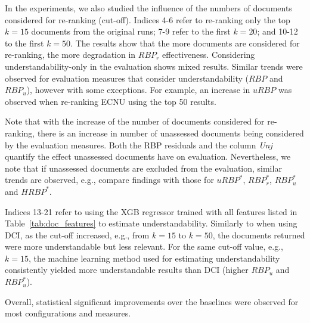 In the experiments, we also studied the influence of the numbers of documents considered for re-ranking (cut-off). Indices 4-6 refer to re-ranking only the top $k=15$ documents from the original runs; 7-9 refer to the first $k=20$; and 10-12 to the first $k=50$. The results show that the more documents are considered for re-ranking, the more degradation in $RBP_r$ effectiveness. Considering understandability-only in the evaluation shows mixed results. Similar trends were observed for evaluation measures that consider understandability ($RBP$ and $RBP_u$), however with some exceptions. For example, an increase in $uRBP$ was observed when re-ranking ECNU using the top 50 results. 

Note that with the increase of the number of documents considered for re-ranking, there is an increase in number of unassessed documents being considered by the evaluation measures. Both the RBP residuals and the column \textit{Unj} quantify the effect unassessed documents have on evaluation. Nevertheless, we note that if unassessed documents are excluded from the evaluation, similar trends are observed, e.g., compare findings with those for $uRBP^*$, $RBP_r^*$, $RBP_u^*$ and $HRBP^*$.


Indices 13-21 refer to using the XGB regressor trained with all features listed in Table~\ref{tab:doc_features} to estimate understandability. Similarly to when using DCI, as the cut-off increased, e.g., from $k=15$ to $k=50$, the documents returned were more understandable but less relevant. For the same cut-off value, e.g., $k=15$, the machine learning method used for estimating understandability consistently yielded more understandable results than DCI (higher $RBP_u$ and $RBP_u^*$). 

Overall, statistical significant improvements over the baselines were observed for most configurations and measures.  


